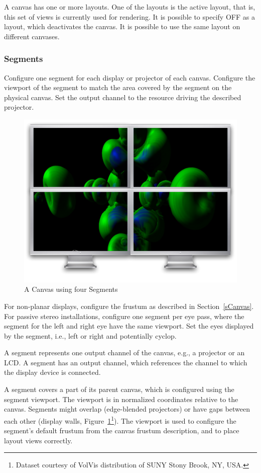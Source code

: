 \documentclass[10pt,a4]{scrartcl}
\newcommand{\fig}[1]{Figure~\ref{#1}}
\newcommand{\sref}[1]{Section~\ref{#1}}
\begin{document}
A canvas has one or more layouts. One of the layouts is the active
layout, that is, this set of views is currently used for rendering. It
is possible to specify \textsf{OFF} as a layout, which deactivates the
canvas. It is possible to use the same layout on different canvases.

\subsubsection{Segments}

Configure one \textsf{segment} for each display or projector of each
canvas. Configure the \textsf{viewport} of the segment to match the area
covered by the segment on the physical canvas. Set the output
\textsf{channel} to the resource driving the described projector.

\begin{figure}
  \includegraphics[width=.382\textwidth]{images/canvas.pdf}
  {\caption{\label{fCanvas}A Canvas using four Segments}}
\end{figure}

For non-planar displays, configure the frustum as described in
\sref{sCanvas}. For passive stereo installations, configure one segment per eye
pass, where the segment for the left and right eye have the same viewport. Set
the eyes displayed by the segment, i.e., left or right and potentially cyclop.

A segment represents one output channel of the canvas, e.g., a projector
or an LCD. A segment has an output channel, which references the channel to
which the display device is connected.

A segment covers a part of its parent canvas, which is configured using the
segment viewport. The viewport is in normalized coordinates relative to the
canvas. Segments might overlap (edge-blended projectors) or have gaps between
each other (display walls, \fig{fCanvas}\footnote{Dataset courtesy of VolVis
  distribution of SUNY Stony Brook, NY, USA.}). The viewport is used to
configure the segment's default frustum from the canvas frustum description, and
to place layout views correctly.
\end{document}
